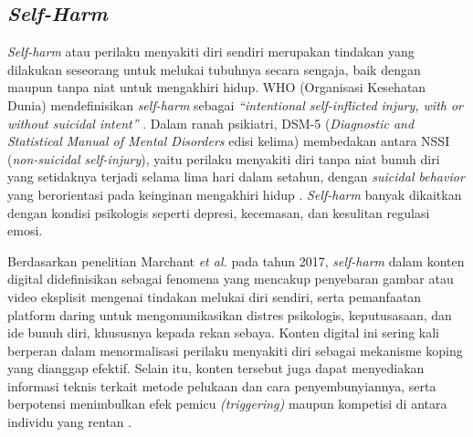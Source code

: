 \subsection{\textit{Self-Harm}} \label{II.teori10}
\textit{Self-harm} atau perilaku menyakiti diri sendiri merupakan tindakan yang dilakukan seseorang untuk melukai tubuhnya secara sengaja, baik dengan maupun tanpa niat untuk mengakhiri hidup. WHO (Organisasi Kesehatan Dunia) mendefinisikan \textit{self-harm} sebagai \textit{ ``intentional self-inflicted injury, with or without suicidal intent''} \cite{WHO2014PreventingSuicide}. Dalam ranah psikiatri, DSM-5 (\textit{Diagnostic and Statistical Manual of Mental Disorders} edisi kelima) membedakan antara NSSI (\textit{non-suicidal self-injury}), yaitu perilaku menyakiti diri tanpa niat bunuh diri yang setidaknya terjadi selama lima hari dalam setahun, dengan \textit{suicidal behavior} yang berorientasi pada keinginan mengakhiri hidup \cite{APA2022_DSM5TR}. \textit{Self-harm} banyak dikaitkan dengan kondisi psikologis seperti depresi, kecemasan, dan kesulitan regulasi emosi.

Berdasarkan penelitian Marchant \textit{et al.} pada tahun 2017, \textit{self-harm} dalam konten digital didefinisikan sebagai fenomena yang mencakup penyebaran gambar atau video eksplisit mengenai tindakan melukai diri sendiri, serta pemanfaatan platform daring untuk mengomunikasikan distres psikologis, keputusasaan, dan ide bunuh diri, khususnya kepada rekan sebaya. Konten digital ini sering kali berperan dalam menormalisasi perilaku menyakiti diri sebagai mekanisme koping yang dianggap efektif. Selain itu, konten tersebut juga dapat menyediakan informasi teknis terkait metode pelukaan dan cara penyembunyiannya, serta berpotensi menimbulkan efek pemicu \textit{(triggering)} maupun kompetisi di antara individu yang rentan \cite{Marchant2017}.

